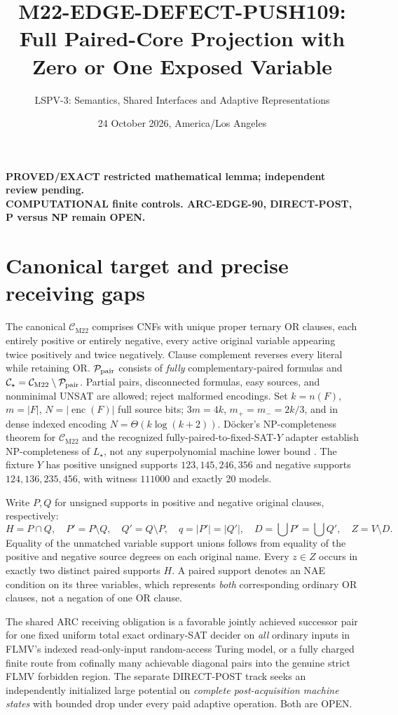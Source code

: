 \documentclass[11pt]{article}
\title{M22-EDGE-DEFECT-PUSH109: Full Paired-Core Projection with Zero or One Exposed Variable}
\author{LSPV-3: Semantics, Shared Interfaces and Adaptive Representations}
\date{24 October 2026, America/Los Angeles}
\newcommand{\CM}{\mathcal C_{\mathrm{M22}}}
\newcommand{\CS}{\mathcal C_\star}
\begin{document}
\maketitle
\begin{center}
\textbf{PROVED/EXACT restricted mathematical lemma; independent review pending.}\\
\textbf{COMPUTATIONAL finite controls. ARC-EDGE-90, DIRECT-POST, P versus NP remain OPEN.}
\end{center}

\section{Canonical target and precise receiving gaps}
The canonical $\CM$ comprises CNFs with unique proper ternary OR clauses, each entirely positive or entirely negative, every active original variable appearing twice positively and twice negatively. Clause complement reverses every literal while retaining OR. $\mathcal P_{\rm pair}$ consists of \emph{fully} complementary-paired formulas and $\CS=\CM\setminus\mathcal P_{\rm pair}$. Partial pairs, disconnected formulas, easy sources, and nonminimal UNSAT are allowed; reject malformed encodings. Set $k=n(F)$, $m=|F|$, $N=|\operatorname{enc}(F)|$ full source bits; $3m=4k$, $m_+=m_-=2k/3$, and in dense indexed encoding $N=\Theta(k\log(k+2))$. D\"ocker's NP-completeness theorem for $\CM$ and the recognized fully-paired-to-fixed-SAT-$Y$ adapter establish NP-completeness of $L_\star$, not any superpolynomial machine lower bound \cite{docker}. The fixture $Y$ has positive unsigned supports $123,145,246,356$ and negative supports $124,136,235,456$, with witness $111000$ and exactly 20 models.

Write $P,Q$ for unsigned supports in positive and negative original clauses, respectively:
\[
H=P\cap Q,\quad P'=P\setminus Q,\quad Q'=Q\setminus P,\quad
q=|P'|=|Q'|,\quad D=\bigcup P'=\bigcup Q',\quad Z=V\setminus D.
\]
Equality of the unmatched variable support unions follows from equality of the positive and negative source degrees on each original name. Every $z\in Z$ occurs in exactly two distinct paired supports $H$. A paired support denotes an NAE condition on its three variables, which represents \emph{both} corresponding ordinary OR clauses, not a negation of one OR clause.

The shared ARC receiving obligation is a favorable jointly achieved successor pair for one fixed uniform total exact ordinary-SAT decider on \emph{all} ordinary inputs in FLMV's indexed read-only-input random-access Turing model, or a fully charged finite route from cofinally many achievable diagonal pairs into the genuine strict FLMV forbidden region. The separate DIRECT-POST track seeks an independently initialized large potential on \emph{complete post-acquisition machine states} with bounded drop under every paid adaptive operation. Both are OPEN.
\end{document}
